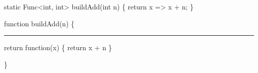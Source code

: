  static Func<int, int> buildAdd(int n) \{ return x => x + n; \}

function buildAdd(n) \{ 

\rule{1cm}{0cm}return function(x) \{ return x + n \} 

\}

